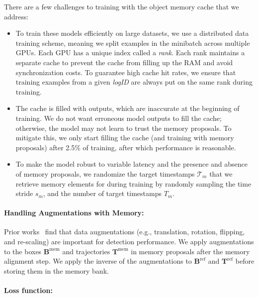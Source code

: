 There are a few challenges to training with the object memory cache that we address:
\begin{itemize}
    \item To train these models efficiently on large datasets, we use a distributed data training scheme, meaning we split examples in the minibatch across multiple GPUs. Each GPU has a unique index called a \textit{rank}. Each rank maintains a separate cache to prevent the cache from filling up the RAM and avoid synchronization costs. To guarantee high cache hit rates, we ensure that training examples from a given \textit{logID} are always put on the same rank during training.
    \item The cache is filled with \ourmodel{} outputs, which are inaccurate at the beginning of training. We do not want erroneous model outputs to fill the cache; otherwise, the model may not learn to trust the memory proposals. To mitigate this, we only start filling the cache (and training with memory proposals) after 2.5\% of training, after which performance is reasonable.
    \item To make the model robust to variable latency and
    the presence and absence of memory proposals, we randomize the target timestamps $\mathcal{T}_m$ that we retrieve memory elements for during training by randomly sampling the time stride $s_m$, and the number of target timestamps $T_m$.
\end{itemize}



\paragraph{Handling Augmentations with Memory:}

Prior works~\cite{safdnet,hednet,centerpoint,leng2023lidar} find that
data augmentations (e.g., translation, rotation, flipping, and re-scaling) are important for detection performance.
We apply augmentations to the boxes $\mathbf{B}^{\mathrm{mem}}$ and trajectories $\mathbf{T}^{\mathrm{mem}}$ in memory proposals
after the memory alignment step. We apply the inverse of the augmentations to $\mathbf{B}^\mathrm{ref}$ and $\mathbf{T}^\mathrm{ref}$ before storing them in the memory bank.

\paragraph{Loss function:} \label{sec:learning}

